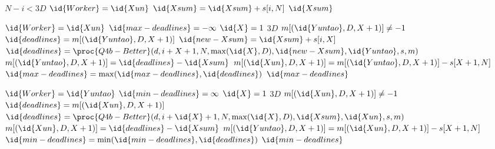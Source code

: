     \begin{spacing}{1.2}
        \begin{codebox}
            \li \If $N - i < 3D$
            \Then
                \li \If $\id{Worker} = \id{Xun}$
                \Then
                    \li $\id{Xsum} = \id{Xsum} + s[i, N]$ 
                \End
                \li \Return $\id{Xsum}$
            \End

            \li \If $\id{Worker} = \id{Xun}$
            \Then
                \li $\id{max-deadlines} = -\infty$
                \li \For $\id{X} = 1$ \To $3D$
                \Do
                    \li \If $m[(\id{Yuntao}, D, X + 1)] \ne -1$ 
                    \Then
                        \li $\id{deadlines} = m[(\id{Yuntao}, D, X + 1)]$ 
                    \li \Else
                        \li $\id{new-Xsum} = \id{Xsum} + s[i, X]$ 
                        \li $\id{deadlines} = \proc{Q4b-Better}(d, i + X + 1, N, \max(\id{X}, D), \id{new-Xsum}, \id{Yuntao}, s, m)$
                        \li $m[(\id{Yuntao}, D, X + 1)] = \id{deadlines} - \id{Xsum}$ 
                        \li $m[(\id{Xun}, D, X + 1)] = m[(\id{Yuntao}, D, X + 1)] - s[X + 1, N]$
                    \End
                    \li $\id{max-deadlines} = \max(\id{max-deadlines}, \id{deadlines})$
                \End
                \li \Return $\id{max-deadlines}$
            \End

            \li \If $\id{Worker} = \id{Yuntao}$
            \Then
                \li $\id{min-deadlines} = \infty$
                \li \For $\id{X} = 1$ \To $3D$
                \Do
                    \li \If $m[(\id{Xun}, D, X + 1)] \ne -1$ 
                    \Then
                        \li $\id{deadlines} = m[(\id{Xun}, D, X + 1)]$ 
                    \li \Else
                        \li $\id{deadlines} = \proc{Q4b-Better}(d, i + \id{X} + 1, N, \max(\id{X}, D), \id{Xsum}, \id{Xun}, s, m)$
                        \li $m[(\id{Xun}, D, X + 1)] = \id{deadlines} - \id{Xsum}$ 
                        \li $m[(\id{Yuntao}, D, X + 1)] = m[(\id{Xun}, D, X + 1)] - s[X + 1, N]$
                    \End
                    \li $\id{min-deadlines} = \min(\id{min-deadlines}, \id{deadlines})$
                \End
                \li \Return $\id{min-deadlines}$
            \End
        \end{codebox}
    \end{spacing}
